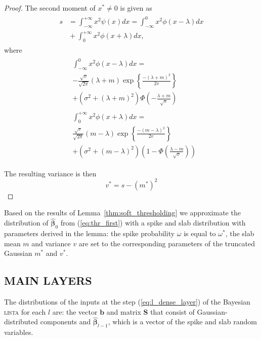 \documentclass[letterpaper]{article}
\begin{document}
\begin{proof}
The second moment of $x^* \neq 0$ is given as
\begin{align}
\label{eq:thr_second_moment}
\begin{split}
s &= \int_{-\infty}^{+\infty}x^2\psi(x)dx = \int_{-\infty}^{0}x^2\phi(x-\lambda)dx \\
&{}+ \int_{0}^{+\infty}x^2\phi(x+\lambda)dx,
\end{split}
\end{align}
where
\begin{align}
\begin{split}
&\int_{-\infty}^{0}x^2\phi(x-\lambda)dx = \\
&-\frac{\sqrt{v}}{\sqrt{2\pi}} (\lambda+m)\exp\left\{\frac{-(\lambda+m)^2}{2v}\right\}\\
& + (\sigma^2 + (\lambda+m)^2)\Phi\left(-\frac{\lambda+m}{\sqrt{v}}\right)
\end{split}\\
\begin{split}
&\int_{0}^{+\infty}x^2\phi(x+\lambda)dx = \\
&\frac{\sqrt{v}}{\sqrt{2\pi}} (m - \lambda)\exp\left\{\frac{-(m - \lambda)^2}{2v}\right\}\\
& + (\sigma^2 + (m - \lambda)^2)\left(1 - \Phi\left(\frac{\lambda -m}{\sqrt{v}}\right)\right)
\end{split}
\end{align}

The resulting variance is then
\begin{equation}
v^* = s- (m^*)^2
\end{equation}
\end{proof}

Based on the results of Lemma~\ref{thm:soft_thresholding} we approximate the distribution of $\widehat{\boldsymbol\beta}_0$ from (\ref{eq:thr_first}) with a spike and slab distribution with parameters derived in the lemma: the spike probability $\omega$ is equal to $\omega^*$, the slab mean $m$ and variance $v$ are set to the corresponding parameters of the truncated Gaussian $m^*$ and $v^*$.

\subsection{\uppercase{Main layers}}
The distributions of the inputs at the step (\ref{eq:l_dense_layer}) of the Bayesian \textsc{lista} for each $l$ are: the vector $\mathbf{b}$ and matrix $\mathbf{S}$ that consist of Gaussian-distributed components and $\widehat{\boldsymbol\beta}_{l-1}$, which is a vector of the spike and slab random variables.
\end{document}
